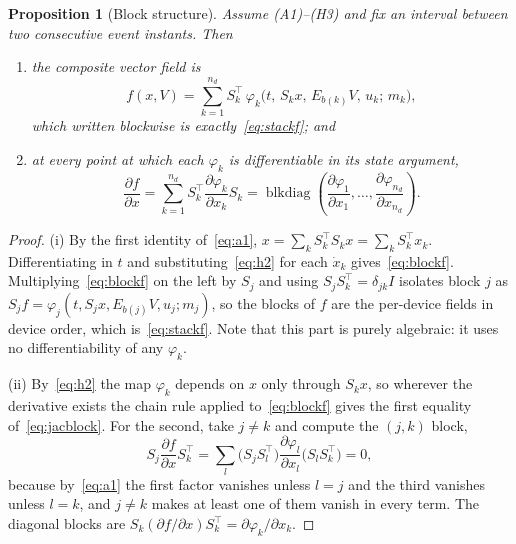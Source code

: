 \documentclass[12pt,a4paper]{article}
\newtheorem{proposition}{Proposition}
\theoremstyle{remark}
\begin{document}
\begin{proposition}[Block structure]\label{prop:block}
Assume \textnormal{(A1)}--\textnormal{(H3)} and fix an interval between two
consecutive event instants. Then
\begin{enumerate}\itemsep2pt
  \item[(i)] the composite vector field is
  \begin{equation}
    f(x,V)=\sum_{k=1}^{n_d}S_k^{\top}\,
      \varphi_k\bigl(t,\,S_kx,\,E_{b(k)}V,\,u_k;\,m_k\bigr),
    \label{eq:blockf}
  \end{equation}
  which written blockwise is exactly~\eqref{eq:stackf}; and
  \item[(ii)] at every point at which each $\varphi_k$ is differentiable in its
  state argument,
  \begin{equation}
    \frac{\partial f}{\partial x}
      =\sum_{k=1}^{n_d}S_k^{\top}\frac{\partial\varphi_k}{\partial x_k}S_k
      =\operatorname{blkdiag}\!\left(
        \frac{\partial\varphi_1}{\partial x_1},\dots,
        \frac{\partial\varphi_{n_d}}{\partial x_{n_d}}\right).
    \label{eq:jacblock}
  \end{equation}
\end{enumerate}
\end{proposition}

\begin{proof}
(i) By the first identity of~\eqref{eq:a1},
$x=\sum_kS_k^{\top}S_kx=\sum_kS_k^{\top}x_k$. Differentiating in $t$ and
substituting~\eqref{eq:h2} for each $\dot x_k$ gives~\eqref{eq:blockf}.
Multiplying~\eqref{eq:blockf} on the left by $S_j$ and using
$S_jS_k^{\top}=\delta_{jk}I$ isolates block $j$ as
$S_jf=\varphi_j(t,S_jx,E_{b(j)}V,u_j;m_j)$, so the blocks of $f$ are the
per-device fields in device order, which is~\eqref{eq:stackf}. Note that this part
is purely algebraic: it uses no differentiability of any $\varphi_k$.

(ii) By~\eqref{eq:h2} the map $\varphi_k$ depends on $x$ only through $S_kx$, so
wherever the derivative exists the chain rule applied to~\eqref{eq:blockf} gives
the first equality of~\eqref{eq:jacblock}. For the second, take $j\neq k$ and
compute the $(j,k)$ block,
\begin{equation}
  S_j\frac{\partial f}{\partial x}S_k^{\top}
   =\sum_{l}\bigl(S_jS_l^{\top}\bigr)
     \frac{\partial\varphi_l}{\partial x_l}\bigl(S_lS_k^{\top}\bigr)=0,
\end{equation}
because by~\eqref{eq:a1} the first factor vanishes unless $l=j$ and the third
vanishes unless $l=k$, and $j\neq k$ makes at least one of them vanish in every
term. The diagonal blocks are $S_k(\partial f/\partial x)S_k^{\top}
=\partial\varphi_k/\partial x_k$.
\end{proof}
\end{document}
